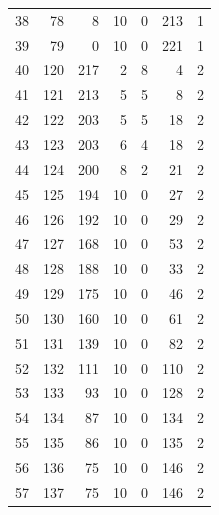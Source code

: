 \documentclass[a4paper,twoside,12pt]{book}
\begin{document}
\begin{appendices}
\begin{table}
\begin{tabular}{lrrrrrr}
		38  &     78 &         8 &        10 &               0 &             213 &         1 \\
		39  &     79 &         0 &        10 &               0 &             221 &         1 \\
		40  &    120 &       217 &         2 &               8 &               4 &         2 \\
		41  &    121 &       213 &         5 &               5 &               8 &         2 \\
		42  &    122 &       203 &         5 &               5 &              18 &         2 \\
		43  &    123 &       203 &         6 &               4 &              18 &         2 \\
		44  &    124 &       200 &         8 &               2 &              21 &         2 \\
		45  &    125 &       194 &        10 &               0 &              27 &         2 \\
		46  &    126 &       192 &        10 &               0 &              29 &         2 \\
		47  &    127 &       168 &        10 &               0 &              53 &         2 \\
		48  &    128 &       188 &        10 &               0 &              33 &         2 \\
		49  &    129 &       175 &        10 &               0 &              46 &         2 \\
		50  &    130 &       160 &        10 &               0 &              61 &         2 \\
		51  &    131 &       139 &        10 &               0 &              82 &         2 \\
		52  &    132 &       111 &        10 &               0 &             110 &         2 \\
		53  &    133 &        93 &        10 &               0 &             128 &         2 \\
		54  &    134 &        87 &        10 &               0 &             134 &         2 \\
		55  &    135 &        86 &        10 &               0 &             135 &         2 \\
		56  &    136 &        75 &        10 &               0 &             146 &         2 \\
		57  &    137 &        75 &        10 &               0 &             146 &         2 \\

\end{tabular}
\end{table}
\end{appendices}
\end{document}
